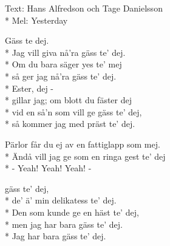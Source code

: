 \pagestyle{Övriga visor}
\begin{SongText}
    \begin{SongInfo}
        Text: Hans Alfredson och Tage Danielsson\\*%
        Mel: Yesterday
    \end{SongInfo}
    \begin{SongVerse}
        Gäss te dej.\\*%
        Jag vill giva nå’ra gäss te’ dej.\\*%
        Om du bara säger yes te’ mej\\*%
        så ger jag nå’ra gäss te’ dej.\\*%
        Ester, dej -\\*%
        gillar jag; om blott du fäster dej\\*%
        vid en så’n som vill ge gäss te’ dej,\\*%
        så kommer jag med präst te’ dej.
    \end{SongVerse}
    \begin{SongVerse}
        Pärlor får du ej av en fattiglapp som mej.\\*%
        Ändå vill jag ge som en ringa gest te’ dej\\*%
        - Yeah! Yeah! Yeah! -
    \end{SongVerse}
    \begin{SongVerse}
        gäss te’ dej,\\*%
        de’ ä’ min delikatess te’ dej.\\*%
        Den som kunde ge en häst te’ dej,\\*%
        men jag har bara gäss te’ dej.\\*%
        Jag har bara gäss te’ dej.
    \end{SongVerse}
\end{SongText}
